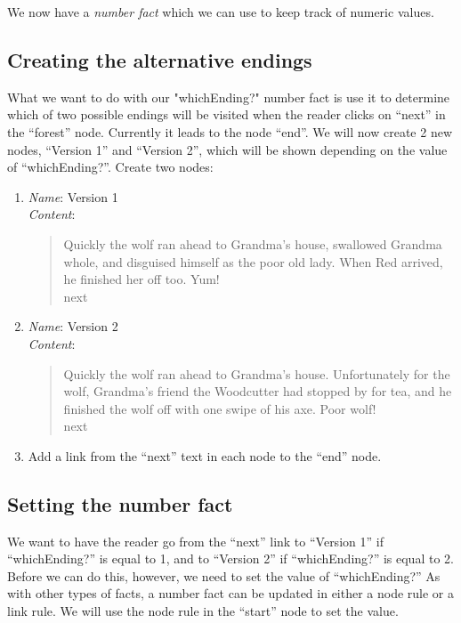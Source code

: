 \documentclass{article}
\begin{document}
We now have a \textit{number fact} which we can use to keep track of 
numeric values.

\subsection{Creating the alternative endings}

What we want to do with our "whichEnding?" number fact is use it to 
determine which of two possible endings will be visited when the 
reader clicks on ``next'' in the ``forest'' node. Currently it leads 
to the node ``end''. We will now create 2 new nodes, ``Version 1'' 
and ``Version 2'', which will be shown depending on the value of 
``whichEnding?''. Create two nodes:

\begin{enumerate}
  \item \textit{Name}: Version 1\\
  \textit{Content}: 
  \begin{quotation}
  \noindent Quickly the wolf ran ahead to Grandma's house, swallowed 
  Grandma whole, and disguised himself as the poor old lady. When Red 
  arrived, he finished her off too. Yum! \\

  \noindent next
  \end{quotation}
  \item \textit{Name}: Version 2\\
  \textit{Content}: 
  \begin{quotation}
  \noindent Quickly the wolf ran ahead to Grandma's house. 
  Unfortunately for the wolf, Grandma's friend the Woodcutter had 
  stopped by for tea, and he finished the wolf off with one swipe of 
  his axe. Poor wolf! \\

  \noindent next
  \end{quotation}
  \item Add a link from the ``next'' text in each node to the ``end'' node.
\end{enumerate}


\subsection{Setting the number fact}

We want to have the reader go from the ``next'' link to ``Version 1'' 
if ``whichEnding?'' is equal to 1, and to ``Version 2'' if 
``whichEnding?'' is equal to 2. Before we can do this, however, we 
need to set the value of ``whichEnding?'' As with other types of 
facts, a number fact can be updated in either a node rule or a link 
rule. We will use the node rule in the ``start'' node to set the 
value.       
\end{document}

